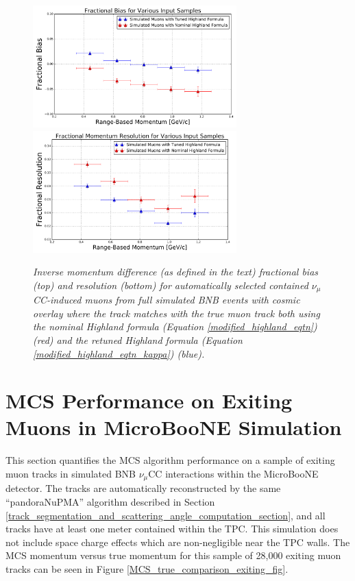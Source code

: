 \documentclass[a4paper,11pt]{article}
\begin{document}
\begin{figure}
\centering
	\includegraphics[width=0.7\textwidth]{Figures/MCS_range_bias_compareHighlandTuning_publicplot.png}
	\includegraphics[width=0.7\textwidth]{Figures/MCS_range_resolution_compareHighlandTuning_publicplot.png}
\caption{\textit{Inverse momentum difference (as defined in the text) fractional bias (top) and resolution (bottom) for automatically selected contained $\nu_\mu$CC-induced muons from full simulated BNB events with cosmic overlay where the track matches with the true muon track both using the nominal Highland formula (Equation \ref{modified_highland_eqtn}) (red) and the retuned Highland formula (Equation \ref{modified_highland_eqtn_kappa}) (blue).}}\label{MCS_range_bias_resolution_compareHighlandFormulas_fig}
\end{figure}






\section{MCS Performance on Exiting Muons in MicroBooNE Simulation}
This section quantifies the MCS algorithm performance on a sample of exiting muon tracks in simulated BNB $\nu_\mu$CC interactions within the MicroBooNE detector. The tracks are automatically reconstructed by the same ``pandoraNuPMA'' algorithm described in Section \ref{track_segmentation_and_scattering_angle_computation_section}, and all tracks have at least one meter contained within the TPC. This simulation does not include space charge effects which are non-negligible near the TPC walls. The MCS momentum versus true momentum for this sample of 28,000 exiting muon tracks can be seen in Figure \ref{MCS_true_comparison_exiting_fig}.\\
\end{document}
